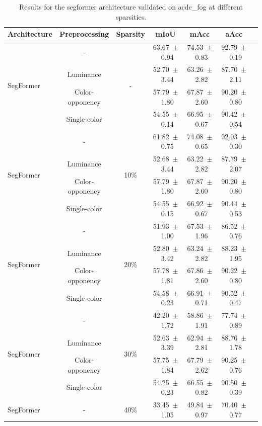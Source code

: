 \begin{table}[h]
\centering
\caption{Results for the segformer architecture validated on acdc_fog at different sparsities.}
\begin{tabular}{@{}lccc ccc@{}}
\toprule
Architecture & Preprocessing & Sparsity & mIoU & mAcc & aAcc \\
\midrule

\multirow{4}{*}{SegFormer} & - & \multirow{4}{*}{-} & 63.67~$\pm$~0.94 & 74.53~$\pm$~0.83 & 92.79~$\pm$~0.19 \\
& Luminance & & 52.70~$\pm$~3.44 & 63.26~$\pm$~2.82 & 87.70~$\pm$~2.11 \\
& Color-opponency & & 57.79~$\pm$~1.80 & 67.87~$\pm$~2.60 & 90.20~$\pm$~0.80 \\
& Single-color & & 54.55~$\pm$~0.14 & 66.95~$\pm$~0.67 & 90.42~$\pm$~0.54 \\
\midrule
\multirow{4}{*}{SegFormer} & - & \multirow{4}{*}{10\%} & 61.82~$\pm$~0.75 & 74.08~$\pm$~0.65 & 92.03~$\pm$~0.30 \\
& Luminance & & 52.68~$\pm$~3.44 & 63.22~$\pm$~2.82 & 87.79~$\pm$~2.07 \\
& Color-opponency & & 57.79~$\pm$~1.80 & 67.87~$\pm$~2.60 & 90.20~$\pm$~0.80 \\
& Single-color & & 54.55~$\pm$~0.15 & 66.92~$\pm$~0.67 & 90.44~$\pm$~0.53 \\
\midrule
\multirow{4}{*}{SegFormer} & - & \multirow{4}{*}{20\%} & 51.93~$\pm$~1.00 & 67.53~$\pm$~1.96 & 86.52~$\pm$~0.76 \\
& Luminance & & 52.80~$\pm$~3.42 & 63.24~$\pm$~2.82 & 88.23~$\pm$~1.95 \\
& Color-opponency & & 57.78~$\pm$~1.81 & 67.86~$\pm$~2.60 & 90.22~$\pm$~0.80 \\
& Single-color & & 54.58~$\pm$~0.23 & 66.91~$\pm$~0.71 & 90.52~$\pm$~0.47 \\
\midrule
\multirow{4}{*}{SegFormer} & - & \multirow{4}{*}{30\%} & 42.20~$\pm$~1.72 & 58.86~$\pm$~1.91 & 77.74~$\pm$~0.89 \\
& Luminance & & 52.63~$\pm$~3.39 & 62.94~$\pm$~2.81 & 88.76~$\pm$~1.78 \\
& Color-opponency & & 57.75~$\pm$~1.84 & 67.79~$\pm$~2.62 & 90.25~$\pm$~0.76 \\
& Single-color & & 54.25~$\pm$~0.23 & 66.55~$\pm$~0.82 & 90.50~$\pm$~0.39 \\
\midrule
\multirow{4}{*}{SegFormer} & - & \multirow{4}{*}{40\%} & 33.45~$\pm$~1.05 & 49.84~$\pm$~0.97 & 70.40~$\pm$~0.77 \\

\end{tabular}
\end{table}
